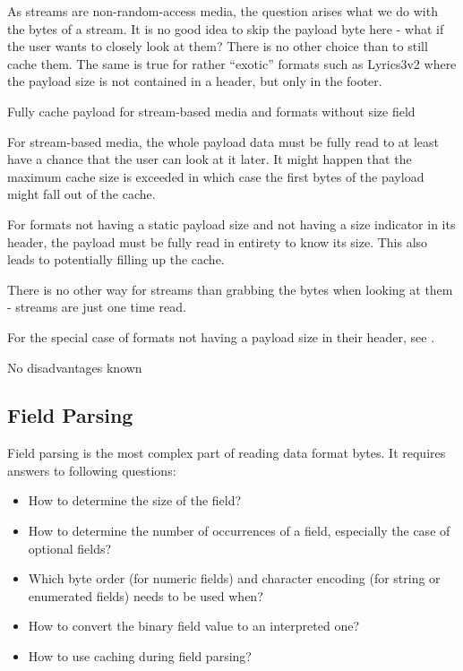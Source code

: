 As streams are non-random-access media, the question arises what we do with the bytes of a stream. It is no good idea to skip the payload byte here - what if the user wants to closely look at them? There is no other choice than to still cache them. The same is true for rather ``exotic'' formats such as Lyrics3v2 where the payload size is not contained in a header, but only in the footer.

{%
Fully cache payload for stream-based media and formats without size field
}
{%
  For stream-based media, the whole payload data must be fully read to at least have a chance that the user can look at it later. It might happen that the maximum cache size is exceeded in which case the first bytes of the payload might fall out of the cache.

For formats not having a static payload size and not having a size indicator in its header, the payload must be fully read in entirety to know its size. This also leads to potentially filling up the cache. 
}
{%
  There is no other way for streams than grabbing the bytes when looking at them - streams are just one time read.

  For the special case of formats not having a payload size in their header, see .
}
{%
No disadvantages known
}

\subsection{Field Parsing}%
\label{sec:FieldParsing}%

Field parsing is the most complex part of reading data format bytes. It requires answers to following questions:
\begin{itemize}
\item How to determine the size of the field?
\item How to determine the number of occurrences of a field, especially the case of optional fields?
\item Which byte order (for numeric fields) and character encoding (for string or enumerated fields) needs to be used when?
\item How to convert the binary field value to an interpreted one?
\item How to use caching during field parsing?
\end{itemize}

